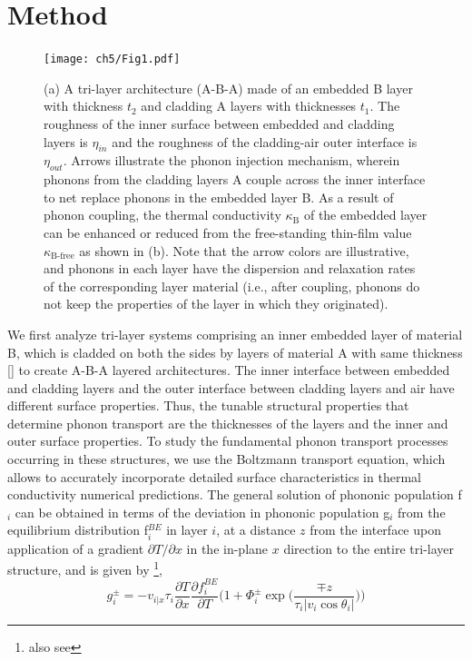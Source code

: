 \section{Method}
\begin{figure}[hbt]
  \centering \texttt{[image: ch5/Fig1.pdf]}
  \caption{(a) A tri-layer architecture (A-B-A) made of an embedded B layer with thickness $t_2$ and cladding A layers with thicknesses $t_1$. The roughness of the inner surface between embedded and cladding layers is $\eta_{in}$ and the roughness of the cladding-air outer interface is $\eta_{out}$. Arrows illustrate the phonon injection mechanism, wherein phonons from the cladding layers A couple across the inner interface to net replace phonons in the embedded layer B. As a result of phonon coupling, the thermal conductivity $\kappa_{\text{B}}$ of the embedded layer can be enhanced or reduced from the free-standing thin-film value $\kappa_{\text{B-free}}$ as shown in (b). Note that the arrow colors are illustrative, and phonons in each layer have the dispersion and relaxation rates of the corresponding layer material (i.e., after coupling, phonons do not keep the properties of the layer in which they originated).}
    \label{fig:ch5_schematic_coupling}
\end{figure}
We first analyze tri-layer systems comprising an inner embedded layer of material B, which is cladded on both the sides by layers of material A with same thickness [] to create A-B-A layered architectures. The inner interface between embedded and cladding layers and the outer interface between cladding layers and air have different surface properties. Thus, the tunable structural properties that determine phonon transport are the thicknesses of the layers and the inner and outer surface properties. To study the fundamental phonon transport processes occurring in these structures, we use the Boltzmann transport equation, which allows to accurately incorporate detailed surface characteristics in thermal conductivity numerical predictions. The general solution of phononic population \gls{f}$_i$ can be obtained in terms of the deviation in phononic population \gls{g}$_i$ from the equilibrium distribution \gls{f}$_i^{BE}$ in layer $i$, at a distance $z$ from the interface upon application of a gradient ${\partial T}/{\partial x}$ in the in-plane $x$ direction to the entire tri-layer structure, and is given by \cite{RN396,ownSpatialTF,book_Ziman}\footnote{also see },
\begin{equation}
  g_i^\pm=  -v_{i|x} \tau_{i}\frac{\partial T}{\partial x}\frac{\partial f_{i}^{BE}}{\partial T}\Bigg(1+\Phi_{i}^\pm\exp\Big(\dfrac{\mp z}{\tau_{i} |v_{i}\cos \theta_i|}\Big) \Bigg)
\label{eq:ch5-gpm}
\end{equation}
